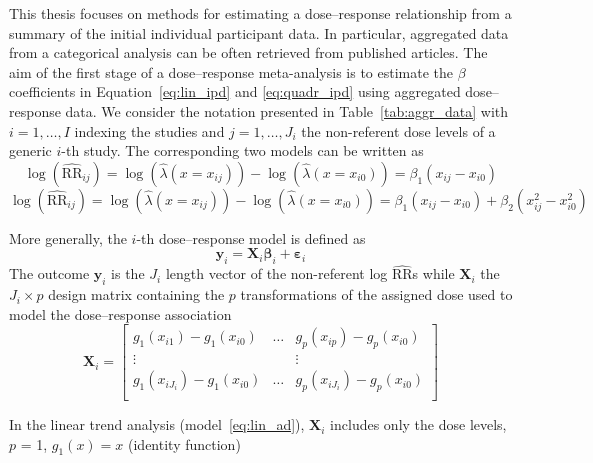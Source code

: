 \documentclass[11pt,a4paper,twoside,openany]{book}\usepackage{knitr}
\begin{document}
{{\noindent This thesis focuses on methods for estimating a dose--response relationship from a summary of the initial individual participant data. In particular, aggregated data from a categorical analysis can be often retrieved from published articles. 
\noindent The aim of the first stage of a dose--response meta-analysis is to estimate the $\beta$ coefficients in Equation~\ref{eq:lin_ipd} and \ref{eq:quadr_ipd} using aggregated dose--response data. We consider the notation presented in Table~\ref{tab:aggr_data} with $i = 1, \dots, I$ indexing the studies and $j = 1, \dots, J_i$ the non-referent dose levels of a generic $i$-th study. The corresponding two models can be written as
\begin{equation}
\log \left( \widehat{\mathrm{RR}}_{ij} \right) = \log \left( \hat \lambda \left(x = x_{ij} \right) \right) - \log \left( \hat \lambda \left(x = x_{i0} \right) \right) = \beta_1\left(x_{ij} - x_{i0} \right)
\label{eq:lin_ad}
\end{equation}
\begin{equation}
\log \left( \widehat{\mathrm{RR}}_{ij} \right) = \log \left( \hat \lambda \left(x = x_{ij} \right) \right) - \log \left( \hat \lambda \left(x = x_{i0} \right) \right) = \beta_1\left(x_{ij} - x_{i0} \right) + \beta_2\left(x_{ij}^2 - x_{i0}^2 \right)
\label{eq:quadr_ad}
\end{equation}

\noindent More generally, the $i$-th dose--response model is defined as
\begin{equation}
\mathbf{y}_i = \mathbf{X}_i \boldsymbol{\beta}_i + \boldsymbol{\varepsilon}_i
\label{eq:drmodel}
\end{equation}
The outcome $\mathbf{y}_i$ is the $J_i$ length vector of the non-referent log $\widehat{\mathrm{RR}}$s while $\mathbf{X}_i$ the $J_i \times p$ design matrix containing the $p$ transformations of the assigned dose used to model the dose--response association
\begin{equation}
 \mathbf{X}_i=\left[
\begin{array}{ccc}
g_{1}(x_{i1}) - g_{1}(x_{i0}) & \hdots & g_{p}(x_{ip}) - g_{p}(x_{i0}) \\
\vdots &  & \vdots \\
g_{1}(x_{iJ_i}) -  g_{1}(x_{i0}) & \hdots & g_{p}(x_{iJ_i}) -  g_{p}(x_{i0}) \\
\end{array}%
\right] 
\label{eq:des.matrix}
\end{equation}

\noindent In the linear trend analysis (model~\ref{eq:lin_ad}), $\mathbf{X}_i$ includes only the dose levels, $p$ = 1, $g_1(x) = x$ (identity function)

}}
\end{document}
